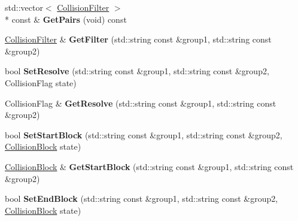 \begin{DoxyCompactItemize}
\item 
\hypertarget{classDCEngine_1_1CollisionTable_ac2ee42f0e29420cc36c2381c4ff05cf9}{std\-::vector$<$ \hyperlink{structDCEngine_1_1CollisionFilter}{Collision\-Filter} $>$\\*
 const \& {\bfseries Get\-Pairs} (void) const }\label{classDCEngine_1_1CollisionTable_ac2ee42f0e29420cc36c2381c4ff05cf9}

\item 
\hypertarget{classDCEngine_1_1CollisionTable_a7fafce069fa4dde57bf8391773fe5fb9}{\hyperlink{structDCEngine_1_1CollisionFilter}{Collision\-Filter} \& {\bfseries Get\-Filter} (std\-::string const \&group1, std\-::string const \&group2)}\label{classDCEngine_1_1CollisionTable_a7fafce069fa4dde57bf8391773fe5fb9}

\item 
\hypertarget{classDCEngine_1_1CollisionTable_aaf23fc16f950d66975522e6e75bb7781}{bool {\bfseries Set\-Resolve} (std\-::string const \&group1, std\-::string const \&group2, Collision\-Flag state)}\label{classDCEngine_1_1CollisionTable_aaf23fc16f950d66975522e6e75bb7781}

\item 
\hypertarget{classDCEngine_1_1CollisionTable_a4e03bd57335e21aa7258203c9e80ca10}{Collision\-Flag \& {\bfseries Get\-Resolve} (std\-::string const \&group1, std\-::string const \&group2)}\label{classDCEngine_1_1CollisionTable_a4e03bd57335e21aa7258203c9e80ca10}

\item 
\hypertarget{classDCEngine_1_1CollisionTable_a3e4235a3f5b7929a5a34db3b04664498}{bool {\bfseries Set\-Start\-Block} (std\-::string const \&group1, std\-::string const \&group2, \hyperlink{structDCEngine_1_1CollisionBlock}{Collision\-Block} state)}\label{classDCEngine_1_1CollisionTable_a3e4235a3f5b7929a5a34db3b04664498}

\item 
\hypertarget{classDCEngine_1_1CollisionTable_a80bb06a58421a3eb4d447f636cb6ccc0}{\hyperlink{structDCEngine_1_1CollisionBlock}{Collision\-Block} \& {\bfseries Get\-Start\-Block} (std\-::string const \&group1, std\-::string const \&group2)}\label{classDCEngine_1_1CollisionTable_a80bb06a58421a3eb4d447f636cb6ccc0}

\item 
\hypertarget{classDCEngine_1_1CollisionTable_aa646c40108e568a6136086b08cf6cdea}{bool {\bfseries Set\-End\-Block} (std\-::string const \&group1, std\-::string const \&group2, \hyperlink{structDCEngine_1_1CollisionBlock}{Collision\-Block} state)}\label{classDCEngine_1_1CollisionTable_aa646c40108e568a6136086b08cf6cdea}


\end{DoxyCompactItemize}
